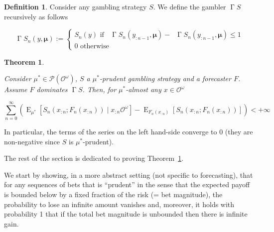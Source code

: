 \documentclass[11pt]{article}
\theoremstyle{definition}
\newtheorem{definition}{Definition}%
\theoremstyle{plain}
\newtheorem{theorem}{Theorem}%
\DeclareMathOperator{\E}{E}
\newcommand{\PM}{\mathcal{P}}
\newcommand{\Ob}{\mathcal{O}}
\newcommand{\OO}{\Ob^\omega}
\newcommand{\PMO}{\PM(\OO)}
\DeclareMathOperator{\SVM}{\Sigma V_{\min}}
\DeclareMathOperator{\SVX}{\Sigma V_{\max}}
\DeclareMathOperator{\PG}{\Gamma}
\newcommand{\BM}{\bm{\mu}}
\begin{document}
\begin{definition}

Consider any gambling strategy $S$. We define the gambler $\PG{S}$ recursively as follows

\begin{equation}
\PG{S}_n\left(y,\BM\right):=\begin{cases} S_n\left(y\right) \text{ if } {\SVX{\PG{S}}_n\left(y_{:n-1},\BM\right)}-{\SVM{\PG{S}}_n\left(y_{:n-1},\BM\right)} \leq 1 \\ 0 \text{ otherwise} \end{cases}
\end{equation}

\end{definition}

\begin{theorem}
\label{thm:prudent}

Consider $\mu^* \in \PMO$, $S$ a $\mu^*$-prudent gambling strategy and a forecaster $F$. Assume $F$ dominates $\PG{S}$. Then, for $\mu^*$-almost any $x \in \OO$

\begin{equation}
\label{eqn:thm_prudent}
\sum_{n=0}^\infty \left(\E_{\mu^*}\left[S_n\left(x_{:n};F_n\left(x_{:n}\right)\right) \mid x_{:n}\OO\right]-\E_{F_n\left(x_{:n}\right)}\left[S_n\left(x_{:n};F_n\left(x_{:n}\right)\right)\right]\right) < +\infty
\end{equation}

\end{theorem}

In particular, the terms of the series on the left hand-side converge to 0 (they are non-negative since $S$ is $\mu^*$-prudent).

The rest of the section is dedicated to proving Theorem~\ref{thm:prudent}.

We start by showing, in a more abstract setting (not specific to forecasting), that for any sequences of bets that is \enquote{prudent} in the sense that the expected payoff is bounded below by a fixed fraction of the risk (= bet magnitude), the probability to lose an infinite amount vanishes and, moreover, it holds with probability 1 that if the total bet magnitude is unbounded then there is infinite gain.
\end{document}
